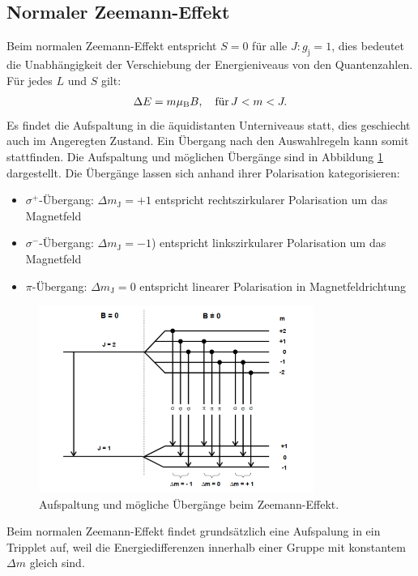 \subsection{Normaler Zeemann-Effekt}
Beim normalen Zeemann-Effekt entspricht $S=0$ für alle $J:g_\mathrm{j}=1$,
dies bedeutet die Unabhängigkeit der Verschiebung der Energieniveaus von den Quantenzahlen.
Für jedes $L$ und $S$ gilt:
\begin{align}
  \Delta E=m\mu_\mathrm{B}B ,\,\,\,\,\ \text{für}\,\-J < m < J.
\end{align}
Es findet die Aufspaltung in die äquidistanten Unterniveaus statt, dies geschiecht auch im Angeregten Zustand.
Ein Übergang nach den Auswahlregeln kann somit stattfinden.
Die Aufspaltung und möglichen Übergänge sind in Abbildung \ref{fig:normal} dargestellt.
Die Übergänge lassen sich anhand ihrer Polarisation kategorisieren:
\begin{itemize}
  \item{$\sigma^+$-Übergang: $\Delta m_\mathrm{J}=+1$  entspricht rechtszirkularer Polarisation um das Magnetfeld}
  \item{$\sigma^-$-Übergang: $\Delta m_\mathrm{J}=-1$) entspricht linkszirkularer Polarisation um das Magnetfeld }
  \item{$\pi$-Übergang: $\Delta m_\mathrm{J}=0$ entspricht linearer Polarisation in Magnetfeldrichtung}
\end{itemize}
\begin{figure}
   \centering
    \includegraphics[width=0.8\textwidth]{normal.PNG}
    \caption{Aufspaltung und mögliche Übergänge beim Zeemann-Effekt.\cite{skript}}
    \label{fig:normal}
\end{figure}
Beim normalen Zeemann-Effekt findet grundsätzlich eine Aufspalung in ein Tripplet auf, weil die Energiedifferenzen
innerhalb einer Gruppe mit konstantem $\Delta m$ gleich sind.
